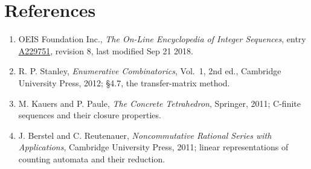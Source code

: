 \documentclass[11pt]{article}
\theoremstyle{definition}
\begin{document}
\section{References}

\begin{enumerate}

\item OEIS Foundation Inc., \emph{The On-Line Encyclopedia of Integer Sequences}, entry \href{https://oeis.org/A229751}{A229751}, revision 8, last modified Sep 21 2018.

\item R. P. Stanley, \emph{Enumerative Combinatorics}, Vol.~1, 2nd ed., Cambridge University Press, 2012; \S4.7, the transfer-matrix method.

\item M. Kauers and P. Paule, \emph{The Concrete Tetrahedron}, Springer, 2011; C-finite sequences and their closure properties.

\item J. Berstel and C. Reutenauer, \emph{Noncommutative Rational Series with Applications}, Cambridge University Press, 2011; linear representations of counting automata and their reduction.

\end{enumerate}
\end{document}
